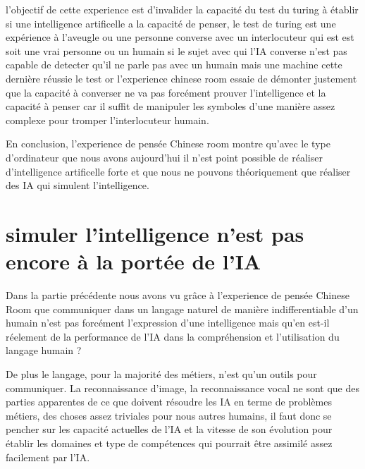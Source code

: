 l'objectif de cette experience est d'invalider la capacité du test du turing à établir si une 
intelligence artificelle a la capacité de penser, le test de turing est une expérience à l'aveugle 
ou une personne converse avec un interlocuteur qui est est soit une vrai personne ou un humain 
si le sujet avec qui l'IA converse n'est pas capable de detecter qu'il ne parle pas avec un humain mais
une machine cette dernière réussie le test or l'experience chinese room essaie de démonter 
justement que la capacité à converser ne va pas forcément prouver l'intelligence et la capacité à penser  
car il suffit de manipuler les symboles d'une manière assez complexe pour tromper l'interlocuteur humain.
\newline

En conclusion, l'experience de pensée Chinese room montre qu'avec le type d'ordinateur que 
nous avons aujourd'hui il n'est point possible de réaliser d'intelligence artificelle forte 
et que nous ne pouvons théoriquement que réaliser des IA qui simulent l'intelligence.


\section{simuler l'intelligence n'est pas encore à la portée de l'IA }

Dans la partie précédente nous avons vu grâce à l'experience de pensée Chinese Room que communiquer
dans un langage naturel de manière indifferentiable d'un humain n'est pas forcément l'expression d'une 
intelligence mais qu'en est-il réelement de la performance de l'IA dans la compréhension et l'utilisation
du langage humain ? \newline

De plus le langage, pour la majorité des métiers, n'est qu'un outils pour communiquer. La reconnaissance 
d'image, la reconnaissance vocal ne sont que des parties apparentes de ce que doivent résoudre les IA 
en terme de problèmes métiers, des choses assez triviales pour nous autres humains, il faut donc se pencher 
sur les capacité actuelles de l'IA et la vitesse de son évolution pour établir les domaines 
et type de compétences qui pourrait être assimilé assez facilement par l'IA. \newline 

